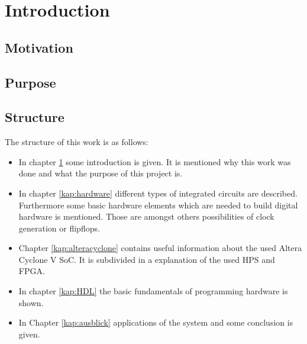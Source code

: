 \chapter{Introduction}
\label{kap:Einleitung} 

\section{Motivation}



\section{Purpose}



\section{Structure}
The structure of this work is as follows:
\begin{itemize}
\item In chapter \ref{kap:Einleitung} some introduction is given. It is mentioned why this work was done and what the purpose of this project is.
\item In chapter \ref{kap:hardware} different types of integrated circuits are described. Furthermore some basic hardware elements which are needed to build digital hardware is mentioned. Those are amongst others possibilities of clock generation or flipflops.
\item Chapter \ref{kap:alteracyclone} contains useful information about the used Altera Cyclone V SoC. It is subdivided in a explanation of the used HPS and FPGA.
\item In chapter \ref{kap:HDL} the basic fundamentals of programming hardware is shown.
\item In Chapter \ref{kap:ausblick} applications of the system and some conclusion is given.
\end{itemize}